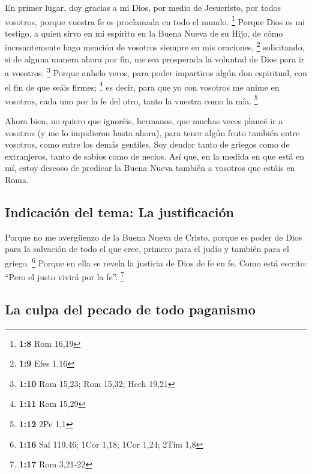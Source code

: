 \begin{paracol}{2}
 En primer lugar, doy gracias a mi Dios, por medio de
Jesucristo, por todos vosotros, porque vuestra fe es proclamada en todo
el mundo. \footnote{\textbf{1:8} Rom 16,19}  Porque Dios
es mi testigo, a quien sirvo en mi espíritu en la Buena Nueva de su
Hijo, de cómo incesantemente hago mención de vosotros siempre en mis
oraciones, \footnote{\textbf{1:9} Efes 1,16} 
solicitando, si de alguna manera ahora por fin, me sea prosperada la
voluntad de Dios para ir a vosotros. \footnote{\textbf{1:10} Rom 15,23;
  Rom 15,32; Hech 19,21}  Porque anhelo veros, para poder
impartiros algún don espiritual, con el fin de que seáis firmes;
\footnote{\textbf{1:11} Rom 15,29}  es decir, para que yo
con vosotros me anime en vosotros, cada uno por la fe del otro, tanto la
vuestra como la mía. \footnote{\textbf{1:12} 2Pe 1,1}

 Ahora bien, no quiero que ignoréis, hermanos, que muchas
veces planeé ir a vosotros (y me lo impidieron hasta ahora), para tener
algún fruto también entre vosotros, como entre los demás gentiles.
 Soy deudor tanto de griegos como de extranjeros, tanto
de sabios como de necios.  Así que, en la medida en que
está en mí, estoy deseoso de predicar la Buena Nueva también a vosotros
que estáis en Roma.

\hypertarget{indicaciuxf3n-del-tema-la-justificaciuxf3n}{%
\subsection{Indicación del tema: La
justificación}\label{indicaciuxf3n-del-tema-la-justificaciuxf3n}}

 Porque no me avergüenzo de la Buena Nueva de Cristo,
porque es poder de Dios para la salvación de todo el que cree, primero
para el judío y también para el griego. \footnote{\textbf{1:16} Sal
  119,46; 1Cor 1,18; 1Cor 1,24; 2Tim 1,8}  Porque en ella
se revela la justicia de Dios de fe en fe. Como está escrito: ``Pero el
justo vivirá por la fe''. \footnote{\textbf{1:17} Rom 3,21-22}

\hypertarget{la-culpa-del-pecado-de-todo-paganismo}{%
\subsection{La culpa del pecado de todo
paganismo}\label{la-culpa-del-pecado-de-todo-paganismo}}


\end{paracol}
